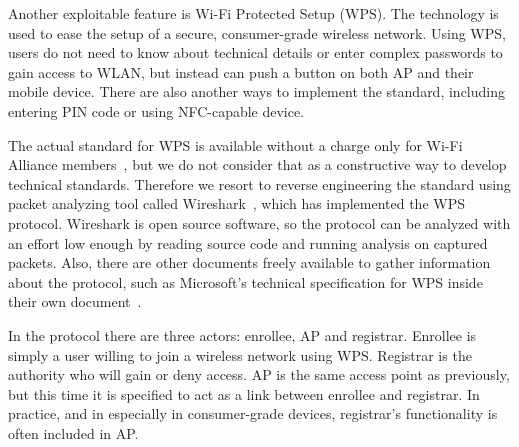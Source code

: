 \documentclass[12pt,a4paper,oneside,pdftex]{report}
\begin{document}
Another exploitable feature is Wi-Fi Protected Setup (WPS). The technology is used to ease the setup of a secure, consumer-grade wireless network. Using WPS, users do not need to know about technical details or enter complex passwords to gain access to WLAN, but instead can push a button on both AP and their mobile device. There are also another ways to implement the standard, including entering PIN code or using NFC-capable device.~\cite{alliance2007wi}

The actual standard for WPS is available without a charge only for Wi-Fi Alliance members~\cite{alliance2007wi}, but we do not consider that as a constructive way to develop technical standards. Therefore we resort to reverse engineering the standard using packet analyzing tool called Wireshark~\cite{wireshark}, which has implemented the WPS protocol. Wireshark is open source software, so the protocol can be analyzed with an effort low enough by reading source code and running analysis on captured packets. Also, there are other documents freely available to gather information about the protocol, such as Microsoft's technical specification for WPS inside their own document~\cite{microsoftWCN}.

In the protocol there are three actors: enrollee, AP and registrar. Enrollee is simply a user willing to join a wireless network using WPS. Registrar is the authority who will gain or deny access. AP is the same access point as previously, but this time it is specified to act as a link between enrollee and registrar. In practice, and in especially in consumer-grade devices, registrar's functionality is often included in AP. 
\end{document}
